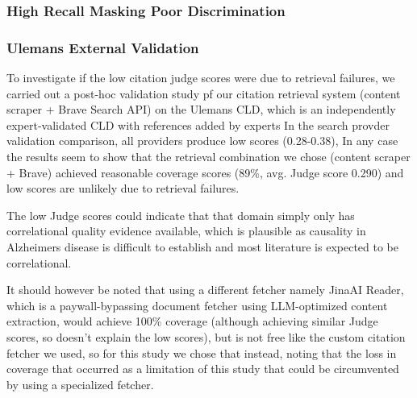 \subsubsection{High Recall Masking Poor Discrimination}

\subsubsection{Ulemans External Validation}
To investigate if the low citation judge scores were due to retrieval failures, we carried out a post-hoc validation study pf our citation retrieval system (content scraper + Brave Search API) on the Ulemans CLD, which is an independently expert-validated CLD with references added by experts \cite{uleman2021mapping}
In the search provder validation comparison, all providers produce low scores (0.28-0.38), 
In any case the results seem to show that the retrieval combination we chose (content scraper + Brave) achieved reasonable coverage scores (89\%, avg. Judge score 0.290) and low scores are unlikely due to retrieval failures.

The low Judge scores could indicate that that domain simply only has correlational quality evidence available, which is plausible as causality in Alzheimers disease is difficult to establish and most literature is expected to be correlational.


It should however be noted that using a different fetcher namely JinaAI Reader, which is a paywall-bypassing document fetcher using LLM-optimized content extraction, would achieve 100\% coverage (although achieving similar Judge scores, so doesn't explain the low scores), but is not free like the custom citation fetcher we used, so for this study we chose that instead, noting that the loss in coverage that occurred as a limitation of this study that could be circumvented by using a specialized fetcher.

